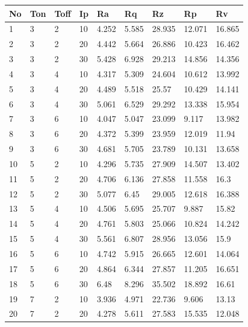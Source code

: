 \documentclass[suppldata]{interact}
\begin{document}
 \begin{table}[htbp]
    \centering
    \begin{tabular}{|l|l|l|l|l|l|l|l|l|}
    \hline
        No& Ton & Toff & Ip & Ra & Rq & Rz & Rp & Rv   \\ \hline
        1 & 3 & 2 & 10 & 4.252 & 5.585 & 28.935 & 12.071 & 16.865 \\ \hline
        2 & 3 & 2 & 20 & 4.442 & 5.664 & 26.886 & 10.423 & 16.462 \\ \hline
        3 & 3 & 2 & 30 & 5.428 & 6.928 & 29.213 & 14.856 & 14.356 \\ \hline
        4 & 3 & 4 & 10 & 4.317 & 5.309 & 24.604 & 10.612 & 13.992 \\ \hline
        5 & 3 & 4 & 20 & 4.489 & 5.518 & 25.57 & 10.429 & 14.141 \\ \hline
        6 & 3 & 4 & 30 & 5.061 & 6.529 & 29.292 & 13.338 & 15.954 \\ \hline
        7 & 3 & 6 & 10 & 4.047 & 5.047 & 23.099 & 9.117 & 13.982 \\ \hline
        8 & 3 & 6 & 20 & 4.372 & 5.399 & 23.959 & 12.019 & 11.94 \\ \hline
        9 & 3 & 6 & 30 & 4.681 & 5.705 & 23.789 & 10.131 & 13.658 \\ \hline
        10 & 5 & 2 & 10 & 4.296 & 5.735 & 27.909 & 14.507 & 13.402 \\ \hline
        11 & 5 & 2 & 20 & 4.706 & 6.136 & 27.858 & 11.558 & 16.3 \\ \hline
        12 & 5 & 2 & 30 & 5.077 & 6.45 & 29.005 & 12.618 & 16.388 \\ \hline
        13 & 5 & 4 & 10 & 4.506 & 5.695 & 25.707 & 9.887 & 15.82 \\ \hline
        14 & 5 & 4 & 20 & 4.761 & 5.803 & 25.066 & 10.824 & 14.242 \\ \hline
        15 & 5 & 4 & 30 & 5.561 & 6.807 & 28.956 & 13.056 & 15.9 \\ \hline
        16 & 5 & 6 & 10 & 4.742 & 5.915 & 26.665 & 12.601 & 14.064 \\ \hline
        17 & 5 & 6 & 20 & 4.864 & 6.344 & 27.857 & 11.205 & 16.651 \\ \hline
        18 & 5 & 6 & 30 & 6.48 & 8.296 & 35.502 & 18.892 & 16.61 \\ \hline
        19 & 7 & 2 & 10 & 3.936 & 4.971 & 22.736 & 9.606 & 13.13 \\ \hline
        20 & 7 & 2 & 20 & 4.278 & 5.611 & 27.583 & 15.535 & 12.048 \\ \hline

\end{tabular}
\end{table}
\end{document}
